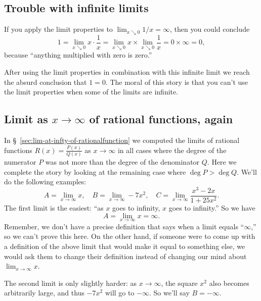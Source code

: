 \subsection{Trouble with infinite limits}
\label{sec:trouble-with-infinite-limits}
If you apply the limit properties to $\lim_{x\searrow0} 1/x = \infty$,
then you could conclude
\[
1 = \lim_{x\searrow 0} x\cdot \frac{1} {x}
 = \lim_{x\searrow 0} x \times \lim_{x\searrow 0}  \frac{1} {x}
 = 0 \times \infty
 = 0,
\]
because ``anything multiplied with zero is zero.''

After using the limit properties in combination with this infinite
limit we reach the absurd conclusion that $1=0$.  The moral of this
story is that you can't use the limit properties when some of the
limits are infinite.

\subsection{Limit as $x\to\infty$ of rational functions, again}
\label{sec:03infinite-limit-of-rational-functions}
In \S~\ref{sec:lim-at-infty-of-rationalfunction} we computed the
limits of rational functions $R(x) = \frac{P(x)} {Q(x)}$ as
$x\to\infty$ in all cases where the degree of the numerator $P$ was
not more than the degree of the denominator $Q$.  Here we complete the
story by looking at the remaining case where $\deg P > \deg Q$.
We'll do the following examples:
\[
  A = \lim_{x\to\infty} x, \quad
  B = \lim_{x\to\infty} -7x^2, \quad
  C = \lim_{x\to\infty} \frac{x^3-2x} {1+25x^2}.
\]
The first limit is the easiest: ``as $x$ goes to infinity, $x$ goes to
infinity.''  So we have
\[
A = \lim_{x\to\infty} x = \infty.
\]
Remember, we don't have a precise definition that says when a limit
equals ``$\infty$,'' so we can't prove this here.  On the other hand,
if someone were to come up with a definition of the above limit that
would make it equal to something else, we would ask them to change
their definition instead of changing our mind about $\lim_{x\to\infty}
x$.

The second limit is only slightly harder: as $x\to\infty$, the square
$x^2$ also becomes arbitrarily large, and thus $-7x^2$ will go to
$-\infty$.  So we'll say  $B=-\infty$.


